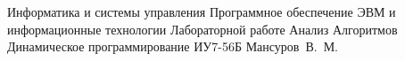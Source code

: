 \makereporttitle
{Информатика и системы управления}
{Программное обеспечение ЭВМ и информационные технологии}
{Лабораторной работе}
{Анализ Алгоритмов}
{Динамическое программирование}
{}
{ИУ7-56Б}
{Мансуров~В.~М.}
{}

\maketableofcontents
\setcounter{page}{1}
	